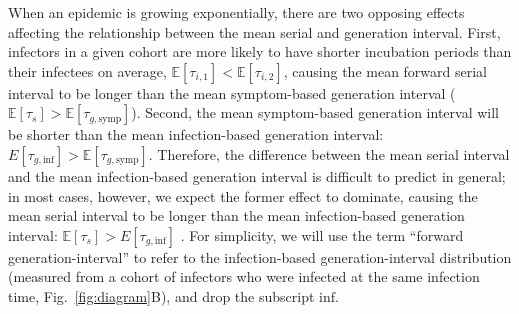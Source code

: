 \documentclass[12pt]{article}
\newcommand{\fref}[1]{Fig.~\ref{fig:#1}}
\begin{document}
When an epidemic is growing exponentially, there are two opposing effects affecting the relationship between the mean serial and generation interval.
First, infectors in a given cohort are more likely to have shorter incubation periods than their infectees on average, $\mathbb E[\tau_{i, 1}] < \mathbb E[\tau_{i, 2}]$, causing the mean forward serial interval to be longer than the mean symptom-based generation interval ($\mathbb E[\tau_s] > \mathbb E[\tau_{g, \mathrm{symp}}]$).
Second, the mean symptom-based generation interval will be shorter than the mean infection-based generation interval: $E[\tau_{g, \mathrm{inf}}] > \mathbb E[\tau_{g, \mathrm{symp}}]$.
Therefore, the difference between the mean serial interval and the mean infection-based generation interval is difficult to predict in general; in most cases, however, we expect the former effect to dominate, causing the mean serial interval to be longer than the mean infection-based generation interval: $\mathbb E[\tau_s] > E[\tau_{g, \mathrm{inf}}]$ \citep{park2021forward}.
For simplicity, we will use the term ``forward generation-interval'' to refer to the infection-based generation-interval distribution (measured from a cohort of infectors who were infected at the same infection time, \fref{diagram}B), and drop the subscript $\mathrm{inf}$.
\end{document}
